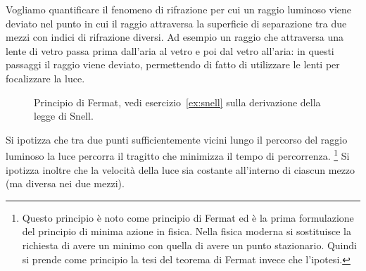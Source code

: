 \begin{exercise}
  \label{ex:snell}
Vogliamo quantificare il fenomeno di rifrazione
per cui un raggio luminoso viene deviato nel punto in cui 
il raggio attraversa la superficie di separazione 
tra due mezzi con indici di rifrazione diversi. 
Ad esempio un raggio che attraversa una lente di vetro passa 
prima dall'aria al vetro e poi dal vetro all'aria:
in questi passaggi il raggio viene deviato, permettendo di fatto di 
utilizzare le lenti per focalizzare la luce.

\begin{figure}
  \begin{center}
  \end{center}
\caption{Principio di Fermat, vedi esercizio~\ref{ex:snell} sulla derivazione della legge di Snell.}
\end{figure}

Si ipotizza che tra due punti sufficientemente vicini lungo il percorso 
del raggio luminoso la luce percorra il tragitto che minimizza il tempo di percorrenza.%
\footnote{
  Questo principio è noto come principio di Fermat 
  ed è la prima formulazione del principio di minima azione in fisica.
  Nella fisica moderna si sostituisce la richiesta di avere un minimo con quella 
  di avere un punto stazionario.
  Quindi si prende come principio la tesi del teorema di Fermat 
  invece che l'ipotesi.
  }
Si ipotizza inoltre che la velocità della luce sia costante all'interno di ciascun mezzo
(ma diversa nei due mezzi).


\end{exercise}
